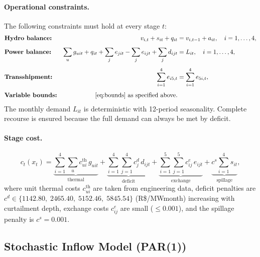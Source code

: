 \documentclass[11pt,letterpaper]{article}
\begin{document}
\paragraph{Operational constraints.}
The following constraints must hold at every stage $t$:
\begin{align}
  &\textbf{Hydro balance:} &
  v_{i,t} + s_{it} + q_{it} &= v_{i,t-1} + a_{it},
  \quad i=1,\ldots,4, \label{eq:hydro_balance}\\[4pt]
  &\textbf{Power balance:} &
  \sum_u g_{uit} + q_{it} + \sum_j e_{jit} - \sum_j e_{ijt}
  + \sum_j d_{ijt} &= L_{it},
  \quad i=1,\ldots,4, \label{eq:power_balance}\\[4pt]
  &\textbf{Transshipment:} &
  \sum_{i=1}^{4} e_{i5,t} &= \sum_{i=1}^{4} e_{5i,t}, \label{eq:transshipment}\\[4pt]
  &\textbf{Variable bounds:} &
  \eqref{eq:bounds} \text{ as specified above.} \label{eq:bounds}
\end{align}
The monthly demand $L_{it}$ is deterministic with 12-period seasonality.
Complete recourse is ensured because the full demand can always be met by deficit.

\paragraph{Stage cost.}
\begin{equation}
  c_t(x_t) = \underbrace{\sum_{i=1}^{4}\sum_{u} c^{\mathrm{th}}_{ui}\,g_{uit}}_{\text{thermal}}
            + \underbrace{\sum_{i=1}^{4}\sum_{j=1}^{4} c^d_j\,d_{ijt}}_{\text{deficit}}
            + \underbrace{\sum_{i=1}^{5}\sum_{j=1}^{5} c^e_{ij}\,e_{ijt}}_{\text{exchange}}
            + \underbrace{c^s \textstyle\sum_{i=1}^{4} s_{it}}_{\text{spillage}},
  \label{eq:stage_cost}
\end{equation}
where unit thermal costs $c^{\mathrm{th}}_{ui}$ are taken from engineering data,
deficit penalties are $c^d \in \{1142.80,\; 2465.40,\; 5152.46,\; 5845.54\}$ (R\$/MWmonth)
increasing with curtailment depth, exchange costs $c^e_{ij}$ are small ($\le 0.001$),
and the spillage penalty is $c^s = 0.001$.

\subsection{Stochastic Inflow Model (PAR(1))}
\label{sec:inflow}
\end{document}
